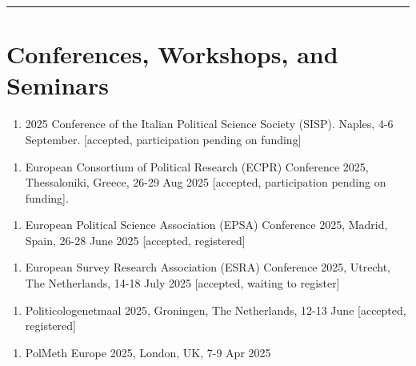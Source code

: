 \documentclass[10pt,]{article}
\providecommand{\tightlist}{%
  \setlength{\itemsep}{0pt}\setlength{\parskip}{0pt}}
\begin{document}
\bigskip \hrule

\section{Conferences, Workshops, and
Seminars}\label{conferences-workshops-and-seminars}

\begin{enumerate}
\def\labelenumi{\arabic{enumi}.}
\setcounter{enumi}{15}
\tightlist
\item
  2025 Conference of the Italian Political Science Society (SISP).
  Naples, 4-6 September. {[}accepted, participation pending on
  funding{]}
\end{enumerate}

\begin{enumerate}
\def\labelenumi{\arabic{enumi}.}
\setcounter{enumi}{14}
\tightlist
\item
  European Consortium of Political Research (ECPR) Conference 2025,
  Thessaloniki, Greece, 26-29 Aug 2025 {[}accepted, participation
  pending on funding{]}.
\end{enumerate}

\begin{enumerate}
\def\labelenumi{\arabic{enumi}.}
\setcounter{enumi}{13}
\tightlist
\item
  European Political Science Association (EPSA) Conference 2025, Madrid,
  Spain, 26-28 June 2025 {[}accepted, registered{]}
\end{enumerate}

\begin{enumerate}
\def\labelenumi{\arabic{enumi}.}
\setcounter{enumi}{12}
\tightlist
\item
  European Survey Research Association (ESRA) Conference 2025, Utrecht,
  The Netherlands, 14-18 July 2025 {[}accepted, waiting to register{]}
\end{enumerate}

\begin{enumerate}
\def\labelenumi{\arabic{enumi}.}
\setcounter{enumi}{11}
\tightlist
\item
  Politicologenetmaal 2025, Groningen, The Netherlands, 12-13 June
  {[}accepted, registered{]}
\end{enumerate}

\begin{enumerate}
\def\labelenumi{\arabic{enumi}.}
\setcounter{enumi}{10}
\tightlist
\item
  PolMeth Europe 2025, London, UK, 7-9 Apr 2025
\end{enumerate}
\end{document}
